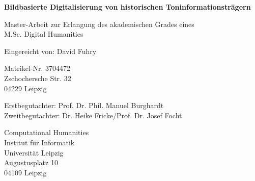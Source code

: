 \documentclass[a4paper, monochrome]{article}
\begin{document}
\begin{titlepage}
    \begin{center}
        \vspace*{1cm}

        \textbf{\Large Bildbasierte Digitalisierung von historischen Toninformationsträgern}

                
        \vspace{2.5cm}


        \vfill
                
        Master-Arbeit zur Erlangung des akademischen Grades eines\\
        M.Sc. Digital Humanities

        \vspace{3cm}
                
        Eingereicht von: David Fuhry
        
        \vspace{0.2cm}

        Matrikel-Nr. 3704472\\
        Zschochersche Str. 32\\
        04229 Leipzig

        \vspace{1cm}

        Erstbegutachter: Prof. Dr. Phil. Manuel Burghardt \\
        Zweitbegutachter: Dr. Heike Fricke/Prof. Dr. Josef Focht
        
        \vspace{0.2cm}
                    
        Computational Humanities\\
        Institut für Informatik\\
        Universität Leipzig\\
        Augustusplatz 10\\
        04109 Leipzig 
                
    \end{center}
\end{titlepage}

\tableofcontents

\thispagestyle{empty}

\newpage





\end{document}
